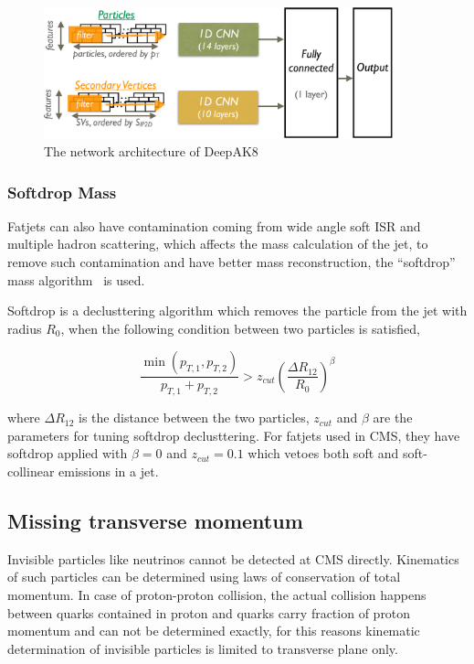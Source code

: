 \begin{figure}[!ht]
  \centering
  \includegraphics[width=0.9\textwidth]{figures/CMS_JME_18_002_Figure_009.pdf}
  \caption[The network architecture of DeepAK8]%
  {The network architecture of DeepAK8~\cite{cms-jme-deep-tagger}}%
  \label{fig:cms-deepAK8-arch}
\end{figure}

\subsubsection{
  Softdrop Mass
}

Fatjets can also have contamination coming from wide angle
soft \gls{ISR} and multiple hadron scattering,
which affects the mass calculation of the jet, to remove
such contamination and have better mass reconstruction, the
``softdrop'' mass algorithm~\cite{softdrop-mass-2014} is used.

Softdrop is a declusttering algorithm which removes the particle from the jet
with radius \( R_0 \), when the following condition between two particles is satisfied,

\begin{equation}
  \frac{\min(p_{T,1}, p_{T,2})}{p_{T,1} + p_{T,2}} > z_{cut} {\left( \frac{\Delta R_{12}}{R_0} \right)}^{\beta}
\end{equation}

where \( \Delta R_{12} \) is the distance between the two particles, \( z_{cut} \)
and \( \beta \) are the parameters for tuning softdrop declusttering.
For fatjets used in \gls{CMS}, they have softdrop applied with
\( \beta = 0\) and \( z_{cut} = 0.1\) which vetoes both soft
and soft-collinear emissions in a jet.

\subsection{
  Missing transverse momentum
}

Invisible particles like neutrinos cannot be detected at \gls{CMS} directly.
Kinematics of such particles can be determined using laws of conservation of
total momentum. In case of proton-proton collision,
the actual collision happens between quarks contained in
proton and quarks carry fraction of proton momentum
and can not be determined exactly, for this reasons kinematic determination
of invisible particles is limited to transverse plane only.

